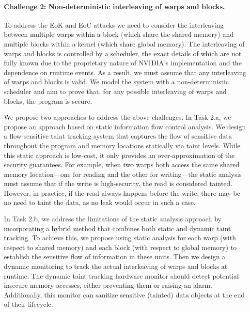 \paragraph{Challenge 2: Non-deterministic interleaving of warps and blocks.}
To address the EoK and EoC attacks we need to consider the interleaving between multiple warps within a block (which share the shared memory) and multiple blocks within a kernel (which share global memory).
%
The interleaving of warps and blocks is controlled by a scheduler, the exact details of which are not fully known due to the proprietary nature of NVIDIA's implementation and the dependence on runtime events.
% 
As a result, we must assume that any interleaving of warps and blocks is valid.
% 
We model the system with a non-deterministic scheduler and aim to prove that, for any possible interleaving of warps and blocks, the program is secure.

We propose two approaches to address the above challenges.
%
In Task 2.a, we propose an approach based on static information flow control analysis.
%
We design a flow-sensitive taint tracking system that captures the flow of sensitive data throughout the program and memory locations statically via taint levels.
%
While this static approach is low-cost, it only provides an over-approximation of the security guarantees. 
% 
For example, when two warps both access the same shared memory location—one for reading and the other for writing—the static analysis must assume that if the write is high-security, the read is considered tainted. 
% 
However, in practice, if the read always happens before the write, there may be no need to taint the data, as no leak would occur in such a case.

In Task 2.b, we address the limitations of the static analysis approach by incorporating a hybrid method that combines both static and dynamic taint tracking.
% 
%
To achieve this, we propose using static analysis for each warp (with respect to shared memory) and each block (with respect to global memory) to establish the sensitive flow of information in these units.
%
Then we design a dynamic monitoring to track the actual interleaving of warps and blocks at runtime.
% 
The dynamic taint tracking hardware monitor should detect potential insecure memory accesses, either preventing them or raising an alarm.
% 
Additionally, this monitor can sanitize sensitive (tainted) data objects at the end of their lifecycle.

